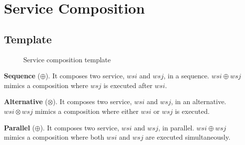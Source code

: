 \section{Service Composition}
\subsection{Template}
\begin{figure}[h!]
  \centering
  \caption{Service composition template}
  \label{fig:service_composition_template}
\end{figure}
\textbf{Sequence} ($\oplus$). It composes two service, $wsi$ and $wsj$, in a sequence. $wsi\oplus wsj$ mimics a composition where $wsj$ is executed after $wsi$.

\textbf{Alternative} ($\otimes$). It composes two service, $wsi$ and $wsj$, in an alternative. $wsi\otimes wsj$ mimics a composition where either $wsi$ or $wsj$ is executed.

\textbf{Parallel} ($\oplus$). It composes two service, $wsi$ and $wsj$, in parallel. $wsi\oplus wsj$ mimics a composition where both $wsi$ and $wsj$ are executed simultaneously.


